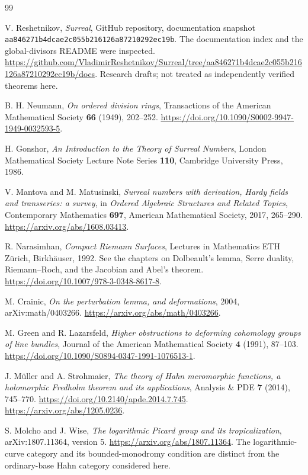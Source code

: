 \documentclass[11pt,letterpaper]{article}
\numberwithin{equation}{section}
\theoremstyle{definition}
\theoremstyle{remark}
\begin{document}
\begin{thebibliography}{99}
\raggedright
{}
V. Reshetnikov, \emph{Surreal}, GitHub repository, documentation snapshot
\texttt{aa846271b4dcae2c055b216126a87210292ec19b}.
The documentation index and the global-divisors README were inspected.
\url{https://github.com/VladimirReshetnikov/Surreal/tree/aa846271b4dcae2c055b216126a87210292ec19b/docs}.
Research drafts; not treated as independently verified theorems here.

B. H. Neumann, \emph{On ordered division rings},
Transactions of the American Mathematical Society \textbf{66} (1949),
202--252. \url{https://doi.org/10.1090/S0002-9947-1949-0032593-5}.

H. Gonshor, \emph{An Introduction to the Theory of Surreal Numbers},
London Mathematical Society Lecture Note Series \textbf{110},
Cambridge University Press, 1986.

V. Mantova and M. Matusinski, \emph{Surreal numbers with derivation,
Hardy fields and transseries: a survey}, in \emph{Ordered Algebraic
Structures and Related Topics}, Contemporary Mathematics \textbf{697},
American Mathematical Society, 2017, 265--290.
\url{https://arxiv.org/abs/1608.03413}.

R. Narasimhan, \emph{Compact Riemann Surfaces}, Lectures in Mathematics
ETH Z\"urich, Birkh\"auser, 1992.
See the chapters on Dolbeault's lemma, Serre duality,
Riemann--Roch, and the Jacobian and Abel's theorem.
\url{https://doi.org/10.1007/978-3-0348-8617-8}.

M. Crainic, \emph{On the perturbation lemma, and deformations},
2004, arXiv:math/0403266.
\url{https://arxiv.org/abs/math/0403266}.

M. Green and R. Lazarsfeld,
\emph{Higher obstructions to deforming cohomology groups of line bundles},
Journal of the American Mathematical Society \textbf{4} (1991), 87--103.
\url{https://doi.org/10.1090/S0894-0347-1991-1076513-1}.

J. M\"uller and A. Strohmaier,
\emph{The theory of Hahn meromorphic functions, a holomorphic Fredholm
theorem and its applications}, Analysis \& PDE \textbf{7} (2014),
745--770. \url{https://doi.org/10.2140/apde.2014.7.745}.
\url{https://arxiv.org/abs/1205.0236}.

S. Molcho and J. Wise,
\emph{The logarithmic Picard group and its tropicalization},
arXiv:1807.11364, version 5.
\url{https://arxiv.org/abs/1807.11364}.
The logarithmic-curve category and its bounded-monodromy condition
are distinct from the ordinary-base Hahn category considered here.
\end{thebibliography}
\end{document}
